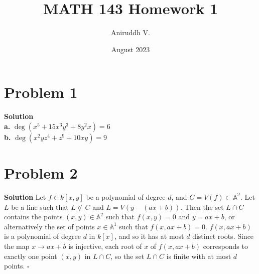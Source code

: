 \documentclass{article}
\title{MATH 143 Homework 1}
\author{Aniruddh V.}
\date{August 2023}
\begin{document}
\maketitle

\section{Problem 1}
\textbf{Solution} \\
\textbf{a. } $\deg(x^5 + 15x^3y^3 + 8y^2x) = 6$ \\
\textbf{b. } $\deg(x^2yz^4 + z^9 + 10xy) = 9$ \\


\section{Problem 2}
\textbf{Solution} Let $f \in k[x, y]$ be a polynomial of degree $d$, and $C = V(f) \subset \mathbb{A^2}$. Let $L$ be a line such that $L \not\subset C$ and $L = V(y -(ax+b))$. Then the set
$L \cap C$ contains the points $(x, y) \in \mathbb{A}^2$ such that $f(x, y) = 0$ and $y = ax+b$, or alternatively the set of points $x \in \mathbb{A}^1$ such that $f(x, ax+b) = 0$. $f(x, ax+b)$ is a
polynomial of degree $d$ in $k[x]$, and so it has at most $d$ distinct roots. Since the map $x \rightarrow ax+b$ is injective, each root of $x$ of $f(x, ax+b)$ corresponds to exactly one point $(x, y)$ in $L \cap C$,
so the set $L \cap C$ is finite with at most $d$ points. $\square$ 
\end{document}

